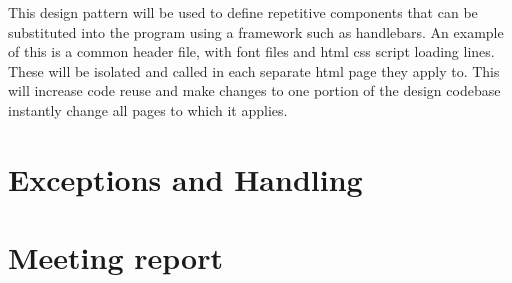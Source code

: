 \documentclass[12pt]{article}
\begin{document}
This design pattern will be used to define repetitive components that can be substituted into the program using a framework such as handlebars. An example of this is a common header file, with font files and html css script loading lines. These will be isolated and called in each separate html page they apply to. This will increase code reuse and make changes to one portion of the design codebase instantly change all pages to which it applies.

\section{Exceptions and Handling}

\section{Meeting report}
\end{document}
